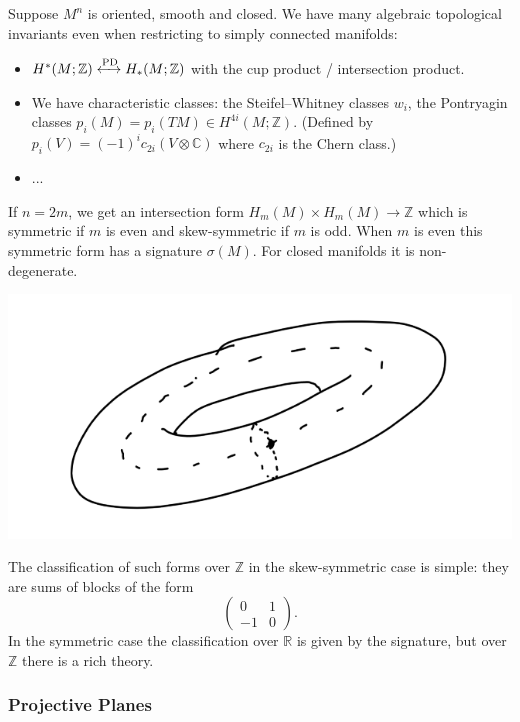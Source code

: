 \documentclass{article}
\theoremstyle{definition}
\newcommand{\PD}{\mathrm{PD}}
\newcommand{\Z}{\mathbb{Z}}
\newcommand{\R}{\mathbb{R}}
\newcommand{\C}{\mathbb{C}}
\begin{document}
Suppose $M^n$ is oriented, smooth and closed. We have many algebraic topological
invariants even when restricting to simply connected manifolds:
\begin{itemize}
    \item $H^*(M;\Z)\xleftrightarrow{\PD}H_*(M;\Z)$ with the cup product /
        intersection product.

    \item We have characteristic classes: the Steifel--Whitney classes $w_i$,
        the Pontryagin classes $p_i(M)=p_i(TM)\in H^{4i}(M;\Z)$. (Defined by
        $p_i(V)=(-1)^ic_{2i}(V\otimes\C)$ where $c_{2i}$ is the Chern class.)

    \item ...
\end{itemize}
If $n=2m$, we get an intersection form $H_m(M)\times H_m(M)\to\Z$ which is
symmetric if $m$ is even and skew-symmetric if $m$ is odd. When $m$ is even this
symmetric form has a signature $\sigma(M)$. For closed manifolds it is
non-degenerate.
\begin{center}
    \includegraphics[scale=0.3]{manifolds_intersection}
\end{center}
The classification of such forms over $\Z$ in the skew-symmetric case is simple:
they are sums of blocks of the form
\begin{equation*}
    \begin{pmatrix}
        0 & 1 \\ -1 & 0
    \end{pmatrix}.
\end{equation*}
In the symmetric case the classification over $\R$ is given by the signature,
but over $\Z$ there is a rich theory.

\subsubsection*{Projective Planes}
\end{document}
